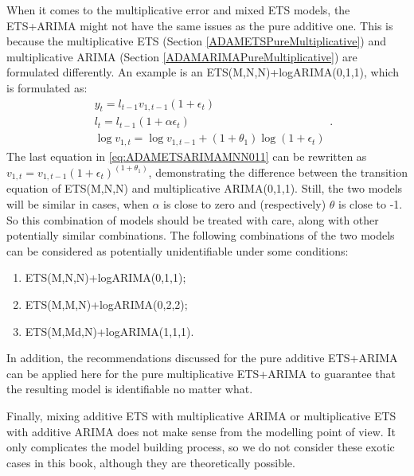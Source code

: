 \documentclass[]{book}
\providecommand{\tightlist}{%
  \setlength{\itemsep}{0pt}\setlength{\parskip}{0pt}}
\theoremstyle{definition}
\theoremstyle{definition}
\theoremstyle{definition}
\theoremstyle{definition}
\theoremstyle{remark}
\begin{document}
When it comes to the multiplicative error and mixed ETS models, the ETS+ARIMA might not have the same issues as the pure additive one. This is because the multiplicative ETS (Section \ref{ADAMETSPureMultiplicative}) and multiplicative ARIMA (Section \ref{ADAMARIMAPureMultiplicative}) are formulated differently. An example is an ETS(M,N,N)+logARIMA(0,1,1), which is formulated as:
\begin{equation}
  \begin{aligned}
    &{y}_{t} = l_{t-1} v_{1,t-1} (1 + \epsilon_t) \\
    &l_t = l_{t-1}(1 + \alpha \epsilon_t) \\
    &\log v_{1,t} = \log v_{1,t-1} + (1+\theta_1) \log (1 + \epsilon_t)
  \end{aligned}.
  \label{eq:ADAMETSARIMAMNN011}
\end{equation}
The last equation in \eqref{eq:ADAMETSARIMAMNN011} can be rewritten as \(v_{1,t} = v_{1,t-1} (1 + \epsilon_t)^{(1+\theta_1)}\), demonstrating the difference between the transition equation of ETS(M,N,N) and multiplicative ARIMA(0,1,1). Still, the two models will be similar in cases, when \(\alpha\) is close to zero and (respectively) \(\theta\) is close to -1. So this combination of models should be treated with care, along with other potentially similar combinations. The following combinations of the two models can be considered as potentially unidentifiable under some conditions:

\begin{enumerate}
\def\labelenumi{\arabic{enumi}.}
\tightlist
\item
  ETS(M,N,N)+logARIMA(0,1,1);
\item
  ETS(M,M,N)+logARIMA(0,2,2);
\item
  ETS(M,Md,N)+logARIMA(1,1,1).
\end{enumerate}

In addition, the recommendations discussed for the pure additive ETS+ARIMA can be applied here for the pure multiplicative ETS+ARIMA to guarantee that the resulting model is identifiable no matter what.

Finally, mixing additive ETS with multiplicative ARIMA or multiplicative ETS with additive ARIMA does not make sense from the modelling point of view. It only complicates the model building process, so we do not consider these exotic cases in this book, although they are theoretically possible.
\end{document}
